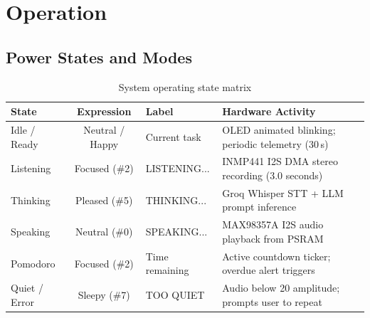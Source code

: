 \documentclass[11pt,a4paper,oneside]{report}
\newcommand{\hdr}[1]{\cellcolor{LightBlue}\textbf{#1}}
\newcommand{\ui}[1]{\textsf{#1}}
\begin{document}
\chapter{Operation}\label{ch:operation}

\section{Power States and Modes}
\begin{table}[H]\centering\small
\caption{System operating state matrix}
\begin{tabularx}{\linewidth}{|l|c|l|X|}\hline
\hdr{State} & \hdr{Expression} & \hdr{Label} & \hdr{Hardware Activity}\\ \hline
Idle / Ready & Neutral / Happy & Current task & OLED animated blinking; periodic telemetry (30\,s)\\ \hline
Listening & Focused (\#2) & \ui{LISTENING...} & INMP441 I2S DMA stereo recording (3.0 seconds)\\ \hline
Thinking & Pleased (\#5) & \ui{THINKING...} & Groq Whisper STT + LLM prompt inference\\ \hline
Speaking & Neutral (\#0) & \ui{SPEAKING...} & MAX98357A I2S audio playback from PSRAM\\ \hline
Pomodoro & Focused (\#2) & Time remaining & Active countdown ticker; overdue alert triggers\\ \hline
Quiet / Error & Sleepy (\#7) & \ui{TOO QUIET} & Audio below 20 amplitude; prompts user to repeat\\ \hline
\end{tabularx}
\end{table}
\end{document}

